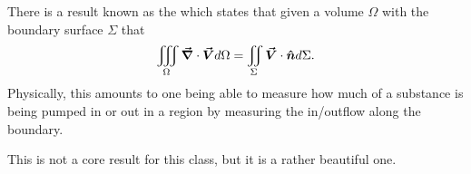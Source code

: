          \begin{remark}
         	There is a result known as the  which states that given a volume $\Omega$ with the boundary surface $\Sigma$ that
         	\[
         	\iiint_\Omega \boldsymbol{\vec{\nabla}} \cdot \boldsymbol{\vec{V}} d\Omega = \iint_\Sigma \boldsymbol{\vec{V}} \cdot \boldsymbol{\hat{n}} d\Sigma.
         	\]
         	Physically, this amounts to one being able to measure how much of a substance is being pumped in or out in a region by measuring the in/outflow along the boundary.

         	This is not a core result for this class, but it is a rather beautiful one.
         \end{remark}
